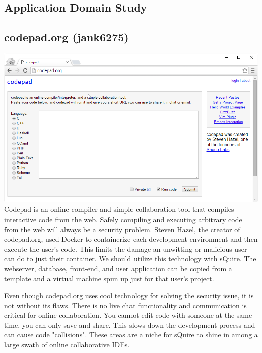 \documentclass[11pt]{report}
\begin{document}
\begin{IDE-like Features}
\begin{}
\begin{Collaborative features that would be "nice":}
\section{Application Domain Study}
\subsection{codepad.org (jank6275)}
\includegraphics[width=\textwidth]{codepad}
Codepad is an online compiler and simple collaboration tool that compiles interactive code from the web. Safely compiling and executing arbitrary code from the web will always be a security problem. Steven Hazel, the creator of codepad.org, used Docker to containerize each development environment and then execute the user’s code. This limits the damage an unwitting or malicious user can do to just their container. We should utilize this technology with sQuire. The webserver, database, front-end, and user application can be copied from a template and a virtual machine spun up just for that user’s project.


Even though codepad.org uses cool technology for solving the security issue, it is not without its flaws. There is no live chat functionality and communication is critical for online collaboration. You cannot edit code with someone at the same time, you can only save-and-share. This slows down the development process and can cause code "collisions". These areas are a niche for sQuire to shine in among a large swath of online collaborative IDEs.


\end{Collaborative features that would be "nice":}
\end{}
\end{IDE-like Features}
\end{document}
